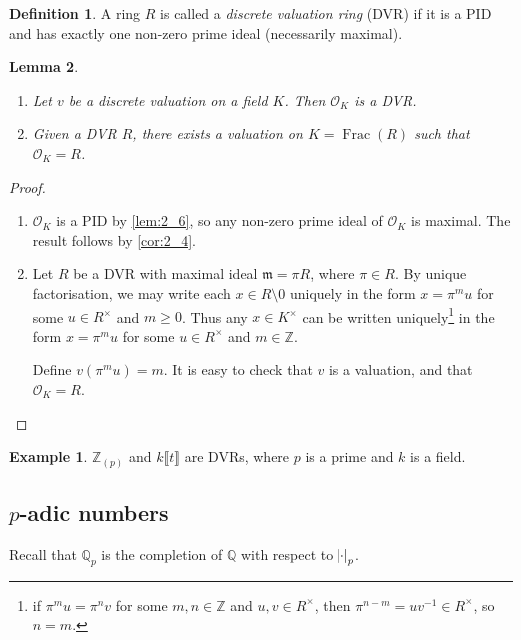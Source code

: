 \documentclass[11pt]{article}
\theoremstyle{definition}
\newtheorem{definition}{Definition}[subsection]
\newtheorem*{example}{Example}
\theoremstyle{plain}
\newtheorem{lemma}[definition]{Lemma}
\theoremstyle{remark}
\DeclareMathOperator{\Frac}{Frac}
\newcommand{\ZZ}{\mathbb{Z}}
\newcommand{\QQ}{\mathbb{Q}}
\newcommand{\cO}{\mathcal{O}}
\newcommand{\fm}{\mathfrak{m}}
\begin{document}
\begin{definition}\label{def:2_7}
    A ring $R$ is called a \emph{discrete valuation ring} (DVR) if it is a PID and has exactly one non-zero prime ideal (necessarily maximal).
\end{definition}

\begin{lemma}\label{lem:2_8}\phantom{}
    \begin{enumerate}
        \item Let $v$ be a discrete valuation on a field $K$. Then $\cO_K$ is a DVR.
        \item Given a DVR $R$, there exists a valuation on $K = \Frac(R)$ such that $\cO_K = R$.
    \end{enumerate}
\end{lemma}
\begin{proof}\phantom{}
    \begin{enumerate}
        \item $\cO_K$ is a PID by \autoref{lem:2_6}, so any non-zero prime ideal of $\cO_K$ is maximal. The result follows by \autoref{cor:2_4}.

        \item Let $R$ be a DVR with maximal ideal $\fm = \pi R$, where $\pi \in R$. By unique factorisation, we may write each $x \in R \setminus 0$ uniquely in the form $x = \pi^m u$ for some $u \in R^\times$ and $m \ge 0$. Thus any $x \in K^\times$ can be written uniquely\footnote{if $\pi^m u = \pi^n v$ for some $m, n \in \ZZ$ and $u, v \in R^\times$, then $\pi^{n-m} = u v^{-1} \in R^\times$, so $n = m$.} in the form $x = \pi^m u$ for some $u \in R^\times$ and $m \in \ZZ$.

        Define $v(\pi^m u) = m$. It is easy to check that $v$ is a valuation, and that $\cO_K = R$. \qedhere
    \end{enumerate}
\end{proof}

\begin{example}
    $\ZZ_{(p)}$ and $k \llbracket t \rrbracket$ are DVRs, where $p$ is a prime and $k$ is a field.
\end{example}

\subsection{\texorpdfstring{$p$}{p}-adic numbers}

\noindent Recall that $\QQ_p$ is the completion of $\QQ$ with respect to $\abs{\cdot}_p$.
\end{document}
